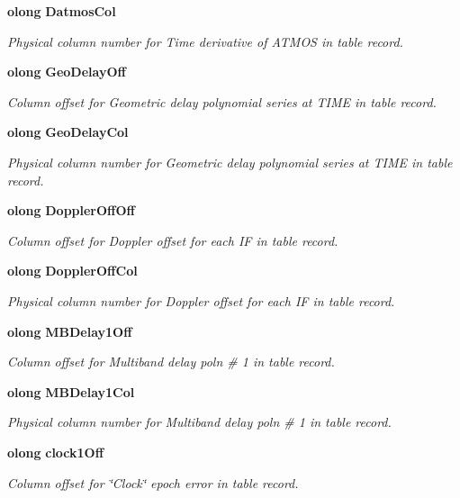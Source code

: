 \begin{CompactItemize}
{\bf olong} {\bf Datmos\-Col}
\begin{CompactList}\small\item\em Physical column number for Time derivative of ATMOS in table record. \item\end{CompactList}\item 
{\bf olong} {\bf Geo\-Delay\-Off}
\begin{CompactList}\small\item\em Column offset for Geometric delay polynomial series at TIME in table record. \item\end{CompactList}\item 
{\bf olong} {\bf Geo\-Delay\-Col}
\begin{CompactList}\small\item\em Physical column number for Geometric delay polynomial series at TIME in table record. \item\end{CompactList}\item 
{\bf olong} {\bf Doppler\-Off\-Off}
\begin{CompactList}\small\item\em Column offset for Doppler offset for each IF in table record. \item\end{CompactList}\item 
{\bf olong} {\bf Doppler\-Off\-Col}
\begin{CompactList}\small\item\em Physical column number for Doppler offset for each IF in table record. \item\end{CompactList}\item 
{\bf olong} {\bf MBDelay1Off}
\begin{CompactList}\small\item\em Column offset for Multiband delay poln \# 1 in table record. \item\end{CompactList}\item 
{\bf olong} {\bf MBDelay1Col}
\begin{CompactList}\small\item\em Physical column number for Multiband delay poln \# 1 in table record. \item\end{CompactList}\item 
{\bf olong} {\bf clock1Off}
\begin{CompactList}\small\item\em Column offset for \char`\"{}Clock\char`\"{} epoch error in table record. \item\end{CompactList}\item 

\end{CompactItemize}

